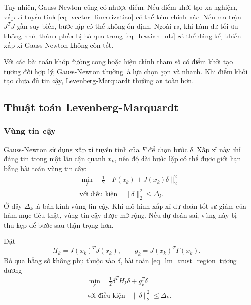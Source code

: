 Tuy nhiên, Gauss-Newton cũng có nhược điểm. Nếu điểm khởi tạo xa nghiệm, xấp xỉ tuyến tính \eqref{eq_vector_linearization} có thể kém chính xác. Nếu ma trận $J^{T}J$ gần suy biến, bước lặp có thể không ổn định. Ngoài ra, khi hàm dư tối ưu không nhỏ, thành phần bị bỏ qua trong \eqref{eq_hessian_nls} có thể đáng kể, khiến xấp xỉ Gauss-Newton không còn tốt.
\medskip

Với các bài toán khớp đường cong hoặc hiệu chỉnh tham số có điểm khởi tạo tương đối hợp lý, Gauss-Newton thường là lựa chọn gọn và nhanh. Khi điểm khởi tạo chưa đủ tin cậy, Levenberg-Marquardt thường an toàn hơn.

\subsection{Thuật toán Levenberg-Marquardt}
\label{SUB_SEC_levenberg_marquardt}

\subsubsection*{Vùng tin cậy}
Gauss-Newton sử dụng xấp xỉ tuyến tính của $F$ để chọn bước $\delta$. Xấp xỉ này chỉ đáng tin trong một lân cận quanh $x_k$, nên độ dài bước lặp có thể được giới hạn bằng bài toán vùng tin cậy:
\begin{equation}
    \begin{aligned}
        &\min_{\delta}
        \quad
        \frac{1}{2}\|F(x_k)+J(x_k)\delta\|_2^2\\
        &\text{với điều kiện}
        \quad
        \|\delta\|_2^2\leq \Delta_k.
    \end{aligned}
    \label{eq_lm_trust_region}
\end{equation}
Ở đây $\Delta_k$ là bán kính vùng tin cậy. Khi mô hình xấp xỉ dự đoán tốt sự giảm của hàm mục tiêu thật, vùng tin cậy được mở rộng. Nếu dự đoán sai, vùng này bị thu hẹp để bước sau thận trọng hơn.
\medskip

Đặt
\begin{equation}
    H_k=J(x_k)^{T}J(x_k),\qquad g_k=J(x_k)^{T}F(x_k).
    \label{eq_lm_H_g}
\end{equation}
Bỏ qua hằng số không phụ thuộc vào $\delta$, bài toán \eqref{eq_lm_trust_region} tương đương
\begin{equation}
    \begin{aligned}
        &\min_{\delta}
        \quad
        \frac{1}{2}\delta^{T}H_k\delta+g_k^{T}\delta\\
        &\text{với điều kiện}
        \quad
        \|\delta\|_2^2\leq \Delta_k.
    \end{aligned}
    \label{eq_lm_quadratic_trust_region}
\end{equation}

